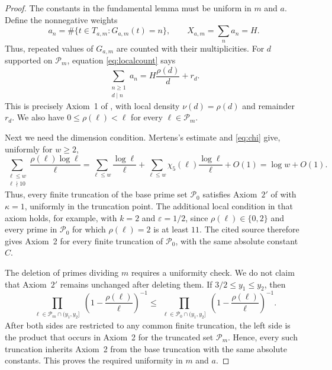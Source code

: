 \documentclass[11pt]{amsart}
\theoremstyle{definition}
\theoremstyle{remark}
\begin{document}
\begin{proof}
The constants in the fundamental lemma must be uniform in $m$ and $a$.
Define the nonnegative weights
  \[
  a_n=\#\{t\in T_{a,m}:G_{a,m}(t)=n\},
  \qquad X_{a,m}=\sum_n a_n=H.
  \]
Thus, repeated values of $G_{a,m}$ are counted with their multiplicities.
For $d$ supported on $\mathcal P_m$, equation \eqref{eq:localcount} says
\[
\sum_{\substack{n\geq1\\d\mid n}}a_n
=H\frac{\rho(d)}d+r_d.
\]
This is precisely Axiom~1 of \cite[pp.~185--186]{Koukoulopoulos}, with local
density $\nu(d)=\rho(d)$ and remainder $r_d$.  We also have
$0\leq\rho(\ell)<\ell$ for every $\ell\in\mathcal P_m$.

Next we need the dimension condition.  Mertens's estimate and
\eqref{eq:chi} give, uniformly for $w\geq2$,
  \begin{equation}\label{eq:weightedrho}
  \sum_{\substack{\ell\leq w\\ \ell\nmid10}}
  \frac{\rho(\ell)\log\ell}{\ell}
  =\sum_{\ell\leq w}\frac{\log\ell}{\ell}
   +\sum_{\ell\leq w}\chi_5(\ell)\frac{\log\ell}{\ell}
   +O(1)
  =\log w+O(1).
  \end{equation}
Thus, every finite truncation of the base prime set $\mathcal P_0$ satisfies
Axiom~$2'$ of \cite[p.~188]{Koukoulopoulos} with $\kappa=1$, uniformly in
the truncation point.  The additional local condition in that axiom holds,
for example, with $k=2$ and $\varepsilon=1/2$, since
$\rho(\ell)\in\{0,2\}$ and every prime in $\mathcal P_0$ for which
$\rho(\ell)=2$ is at least $11$.  The cited source therefore gives Axiom~2
for every finite truncation of $\mathcal P_0$, with the same absolute
constant $C$.

The deletion of primes dividing $m$ requires a uniformity check.  We do not
claim that Axiom~$2'$ remains unchanged after deleting them.  If
$3/2\leq y_1\leq y_2$, then
\[
\prod_{\substack{\ell\in\mathcal P_m\cap(y_1,y_2]}}
\left(1-\frac{\rho(\ell)}\ell\right)^{-1}
\leq
\prod_{\substack{\ell\in\mathcal P_0\cap(y_1,y_2]}}
\left(1-\frac{\rho(\ell)}\ell\right)^{-1}.
\]
After both sides are restricted to any common finite truncation, the left
side is the product that occurs in Axiom~2 for the truncated set
$\mathcal P_m$.  Hence, every such truncation inherits Axiom~2 from the base
truncation with the same absolute constants.  This proves the required
uniformity in $m$ and $a$.


\end{proof}
\end{document}
